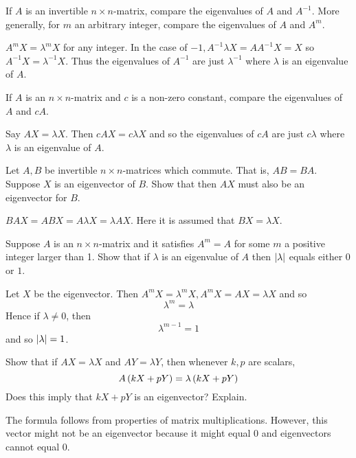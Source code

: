 \begin{enumialphparenastyle}

\begin{ex} If $A$ is an invertible $n\times n$-matrix, compare the eigenvalues of
$A$ and $A^{-1}$. More generally, for $m$ an arbitrary integer, compare the
eigenvalues of $A$ and $A^{m}$. \vspace{1mm}
\begin{sol}
$A^{m}X=\lambda ^{m}X$ for
any integer. In the case of $-1,A^{-1}\lambda X=AA^{-1}X=X$
so $A^{-1}X =\lambda ^{-1}X$. Thus the eigenvalues of $A^{-1}$ are just $\lambda ^{-1}$ where $\lambda $ is an eigenvalue of $A$.
\end{sol}
\end{ex} 

\begin{ex} If $A$ is an $n\times n$-matrix and $c$ is a non-zero constant, compare
the eigenvalues of $A$ and $cA$. \vspace{1mm} 
\begin{sol}
Say $AX=\lambda X$. Then $
cAX=c\lambda X$ and so the eigenvalues of $cA$ are just $
c\lambda $ where $\lambda $ is an eigenvalue of $A$.
\end{sol}
\end{ex}

\begin{ex} Let $A,B$ be invertible $n\times n$-matrices which commute. That is, $AB=BA$. Suppose $X$ is an eigenvector of $B$. Show that then 
$AX$ must also be an eigenvector for $B$. \vspace{1mm} 
\begin{sol}
 $BAX=ABX
=A\lambda X=\lambda AX$. Here it is assumed that $BX=\lambda X$.
\end{sol}
\end{ex}

\begin{ex} Suppose $A$ is an $n\times n$-matrix and it satisfies $A^{m}=A$ for
some $m$ a positive integer larger than 1. Show that if $\lambda $ is an
eigenvalue of $A$ then $\left|\lambda \right|$ equals either 0 or $
1$. \vspace{1mm}
\begin{sol}
Let $X$ be the eigenvector. Then $A^{m}X=\lambda ^{m}
X,A^{m}X=AX=\lambda X$ and so
\[
\lambda ^{m}=\lambda
\]
Hence if $\lambda \neq 0$, then
\[
\lambda ^{m-1}=1
\]
and so $\left|\lambda \right|=1$.
\end{sol}
\end{ex}

\begin{ex} Show that if $AX=\lambda X$ and $AY=\lambda Y$, then whenever $k,p$ are scalars,
\begin{equation*}
A\left(kX+pY\right) =\lambda \left(kX+pY\right) 
\end{equation*}
Does this imply that $kX+pY$ is an eigenvector? Explain.
\vspace{1mm} 
\begin{sol}
The formula follows from properties of matrix multiplications. However,
this vector might not be an eigenvector because it might equal $0$
and eigenvectors cannot equal $0$. 
\end{sol}
\end{ex}


\end{enumialphparenastyle}
